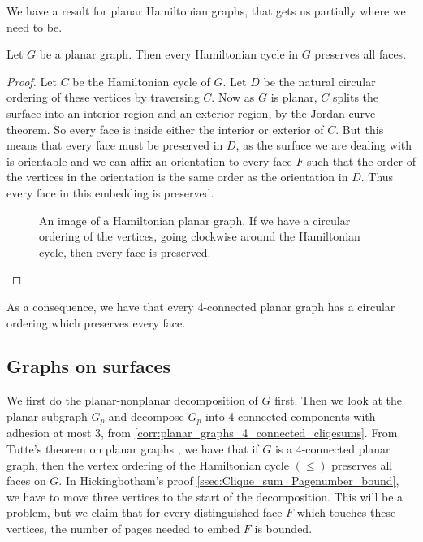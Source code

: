 We have a result for planar Hamiltonian graphs, that gets us partially where we need to be. 
\begin{theorem}
	Let $G$ be a planar graph. Then every Hamiltonian cycle in $G$ preserves all faces. 
\end{theorem}

\begin{proof}
	Let $C$ be the Hamiltonian cycle of $G$. Let $D$ be the natural circular ordering of these vertices by traversing $C$. Now as $G$ is planar, $C$ splits the surface into an interior region and an exterior region, by the Jordan curve theorem. So every face is inside either the interior or exterior of $C$. But this means that every face must be preserved in $D$, as the surface we are dealing with is orientable and we can affix an orientation to every face $F$ such that the order of the vertices in the orientation is the same order as the orientation in $D$. Thus every face in this embedding is preserved. 
	\begin{figure}
		\centering
		
		\caption{An image of a Hamiltonian planar graph. If we have a circular ordering of the vertices, going clockwise around the Hamiltonian cycle, then every face is preserved.}
		\label{fig:hamiltonian_planar}
	\end{figure}
	
\end{proof}
As a consequence, we have that every 4-connected planar graph has a circular ordering which preserves every face. 
\subsection{Graphs on surfaces}
We first do the planar-nonplanar decomposition of $G$ first. 
Then we look at the planar subgraph $G_p$ and decompose $G_p$ into 4-connected components with adhesion at most 3, from \cref{corr:planar_graphs_4_connected_cliqesums}. 
From Tutte's theorem on planar graphs \cite{tutteTheoremPlanarGraphs1956}, we have that if $G$ is a 4-connected planar graph, then the vertex ordering of the Hamiltonian cycle $(\leq)$ preserves all faces on $G$.
In Hickingbotham's proof \cref{ssec:Clique_sum_Pagenumber_bound}, we have to move three vertices to the start of the decomposition. This will be a problem, but we claim that for every distinguished face $F$ which touches these vertices, the number of pages needed to embed $F$ is bounded. 

